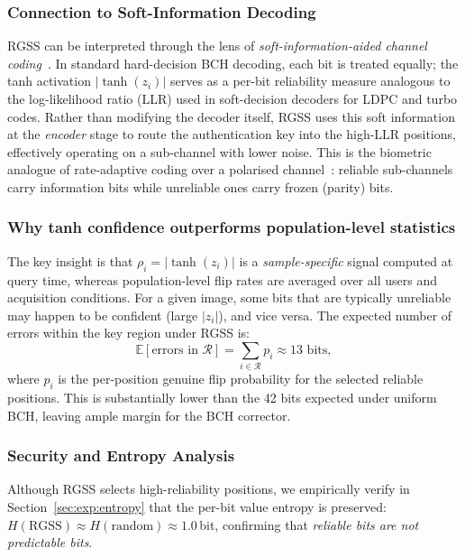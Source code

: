 \documentclass[journal]{IEEEtran}
\begin{document}
\subsubsection{Connection to Soft-Information Decoding}

RGSS can be interpreted through the lens of
\emph{soft-information-aided channel coding}~\cite{arikan2009channel}.
In standard hard-decision BCH decoding, each bit is treated equally;
the tanh activation $|\tanh(z_i)|$ serves as a per-bit reliability
measure analogous to the log-likelihood ratio (LLR) used in
soft-decision decoders for LDPC and turbo codes.
Rather than modifying the decoder itself, RGSS uses this soft
information at the \emph{encoder} stage to route the authentication
key into the high-LLR positions, effectively operating on a
sub-channel with lower noise.
This is the biometric analogue of rate-adaptive coding over a
polarised channel~\cite{arikan2009channel}: reliable sub-channels
carry information bits while unreliable ones carry frozen (parity)
bits.

\subsubsection{Why tanh confidence outperforms population-level statistics}

The key insight is that $\rho_i = |\tanh(z_i)|$ is a
\emph{sample-specific} signal computed at query time, whereas
population-level flip rates are averaged over all users and
acquisition conditions.
For a given image, some bits that are typically unreliable may
happen to be confident (large $|z_i|$), and vice versa.
The expected number of errors within the key region under RGSS is:
\begin{equation}
  \mathbb{E}[\text{errors in } \mathcal{R}]
  = \sum_{i \in \mathcal{R}} p_i
  \approx 13 \text{ bits},
  \label{eq:expected_errors}
\end{equation}
where $p_i$ is the per-position genuine flip probability for
the selected reliable positions.
This is substantially lower than the 42 bits expected under
uniform BCH, leaving ample margin for the BCH corrector.

\subsubsection{Security and Entropy Analysis}

Although RGSS selects high-reliability positions, we empirically verify in
Section~\ref{sec:exp:entropy} that the per-bit value entropy is
preserved: $H(\text{RGSS}) \approx H(\text{random}) \approx 1.0$\,bit,
confirming that \emph{reliable bits are not predictable bits}.
\end{document}
